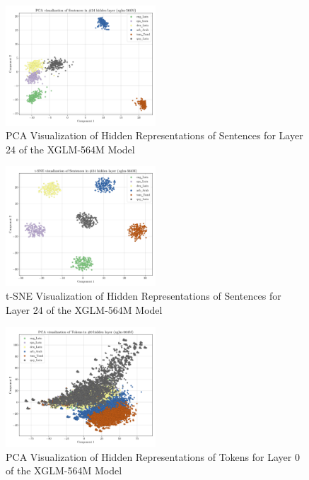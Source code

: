 \documentclass[11pt]{article}
\begin{document}
\begin{figure}[h]
    \centering
    \includegraphics[width=0.5\textwidth]{plots/sentence_xglm-564M_layer_24_PCA.png}
    \caption{PCA Visualization of Hidden Representations of Sentences for Layer 24 of the XGLM-564M Model}
\end{figure}
\begin{figure}[h]
    \centering
    \includegraphics[width=0.5\textwidth]{plots/sentence_xglm-564M_layer_24_t-SNE.png}
    \caption{t-SNE Visualization of Hidden Representations of Sentences for Layer 24 of the XGLM-564M Model}
\end{figure}

\begin{figure}[h]
    \centering
    \includegraphics[width=0.5\textwidth]{plots/token_xglm-564M_layer_0_PCA.png}
    \caption{PCA Visualization of Hidden Representations of Tokens for Layer 0 of the XGLM-564M Model}
\end{figure}
\end{document}
